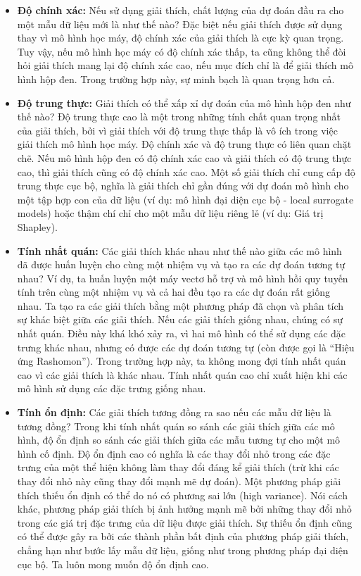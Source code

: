 \begin{itemize}
    \item \textbf{Độ chính xác:} Nếu sử dụng giải thích, chất lượng của dự đoán đầu ra cho một mẫu dữ liệu mới là như thế nào? Đặc biệt nếu giải thích được sử dụng thay vì mô hình học máy, độ chính xác của giải thích là cực kỳ quan trọng. Tuy vậy, nếu mô hình học máy có độ chính xác thấp, ta cũng không thể đòi hỏi giải thích mang lại độ chính xác cao, nếu mục đích chỉ là để giải thích mô hình hộp đen. Trong trường hợp này, sự minh bạch là quan trọng hơn cả.
    
    \item \textbf{Độ trung thực:} Giải thích có thể xấp xỉ dự đoán của mô hình hộp đen như thế nào? Độ trung thực cao là một trong những tính chất quan trọng nhất của giải thích, bởi vì giải thích với độ trung thực thấp là vô ích trong việc giải thích mô hình học máy. Độ chính xác và độ trung thực có liên quan chặt chẽ. Nếu mô hình hộp đen có độ chính xác cao và giải thích có độ trung thực cao, thì giải thích cũng có độ chính xác cao. Một số giải thích chỉ cung cấp độ trung thực cục bộ, nghĩa là giải thích chỉ gần đúng với dự đoán mô hình cho một tập hợp con của dữ liệu (ví dụ: mô hình đại diện cục bộ - local surrogate models) hoặc thậm chí chỉ cho một mẫu dữ liệu riêng lẻ (ví dụ: Giá trị Shapley).
    
    \item \textbf{Tính nhất quán:} Các giải thích khác nhau như thế nào giữa các mô hình đã được huấn luyện cho cùng một nhiệm vụ và tạo ra các dự đoán tương tự nhau? Ví dụ, ta huấn luyện một máy vectơ hỗ trợ và mô hình hồi quy tuyến tính trên cùng một nhiệm vụ và cả hai đều tạo ra các dự đoán rất giống nhau. Ta tạo ra các giải thích bằng một phương pháp đã chọn và phân tích sự khác biệt giữa các giải thích. Nếu các giải thích giống nhau, chúng có sự nhất quán. Điều này khá khó xảy ra, vì hai mô hình có thể sử dụng các đặc trưng khác nhau, nhưng có được các dự đoán tương tự (còn được gọi là ``Hiệu ứng Rashomon''). Trong trường hợp này, ta không mong đợi tính nhất quán cao vì các giải thích là khác nhau. Tính nhất quán cao chỉ xuất hiện khi các mô hình sử dụng các đặc trưng giống nhau.
    
    \item \textbf{Tính ổn định:} Các giải thích tương đồng ra sao nếu các mẫu dữ liệu là tương đồng? Trong khi tính nhất quán so sánh các giải thích giữa các mô hình, độ ổn định so sánh các giải thích giữa các mẫu tương tự cho một mô hình cố định. Độ ổn định cao có nghĩa là các thay đổi nhỏ trong các đặc trưng của một thể hiện không làm thay đổi đáng kể giải thích (trừ khi các thay đổi nhỏ này cũng thay đổi mạnh mẽ dự đoán). Một phương pháp giải thích thiếu ổn định có thể do nó có phương sai lớn (high variance). Nói cách khác, phương pháp giải thích bị ảnh hưởng mạnh mẽ bởi những thay đổi nhỏ trong các giá trị đặc trưng của dữ liệu được giải thích. Sự thiếu ổn định cũng có thể được gây ra bởi các thành phần bất định của phương pháp giải thích, chẳng hạn như bước lấy mẫu dữ liệu, giống như trong phương pháp đại diện cục bộ. Ta luôn mong muốn độ ổn định cao.
    

\end{itemize}

